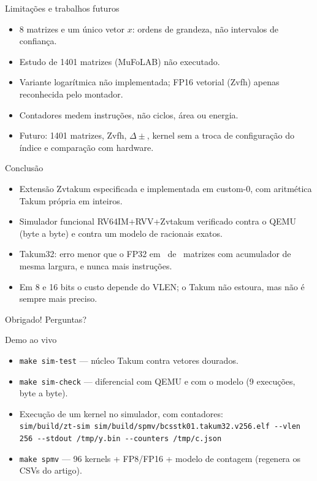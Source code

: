 \documentclass[aspectratio=169,10pt]{beamer}
\begin{document}
\begin{frame}{Limitações e trabalhos futuros}
	\begin{itemize}
		\item 8 matrizes e um único vetor $x$: ordens de grandeza, não
		      intervalos de confiança.
		\item Estudo de 1401 matrizes (MuFoLAB) não executado.
		\item Variante logarítmica não implementada; FP16 vetorial (Zvfh)
		      apenas reconhecida pelo montador.
		\item Contadores medem instruções, não ciclos, área ou energia.
		\item Futuro: 1401 matrizes, Zvfh, $\Delta\pm$, kernel sem a troca de
		      configuração do índice e comparação com hardware.
	\end{itemize}
\end{frame}

\begin{frame}{Conclusão}
	\begin{itemize}
		\item Extensão Zvtakum especificada e implementada em custom-0, com
		      aritmética Takum própria em inteiros.
		\item Simulador funcional RV64IM+RVV+Zvtakum verificado contra o QEMU
		      (byte a byte) e contra um modelo de racionais exatos.
		\item Takum32: erro menor que o FP32 em \ParTrintaAcFPTakumVence\ de
		      \NumMatrizes\ matrizes com acumulador de mesma largura, e nunca
		      mais instruções.
		\item Em 8 e 16 bits o custo depende do VLEN; o Takum não estoura,
		      mas não é sempre mais preciso.
	\end{itemize}
	\vfill
	\centering \large Obrigado! Perguntas?
\end{frame}

\begin{frame}{Demo ao vivo}
	\begin{itemize}
		\item \texttt{make sim-test} --- núcleo Takum contra vetores dourados.
		\item \texttt{make sim-check} --- diferencial com QEMU e com o modelo
		      (9 execuções, byte a byte).
		\item Execução de um kernel no simulador, com contadores:\\
		      \texttt{sim/build/zt-sim
		      sim/build/spmv/bcsstk01.takum32.v256.elf
		      -{}-vlen 256 -{}-stdout /tmp/y.bin
		      -{}-counters /tmp/c.json}
		\item \texttt{make spmv} --- 96 kernels + FP8/FP16 + modelo de
		      contagem (regenera os CSVs do artigo).
	\end{itemize}
\end{frame}
\end{document}
